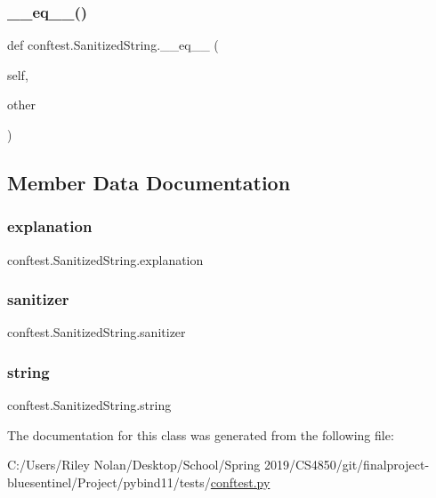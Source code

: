 \subsubsection{\texorpdfstring{\_\_eq\_\_()}{\_\_eq\_\_()}}
{\footnotesize\ttfamily def conftest.\+Sanitized\+String.\+\_\+\+\_\+eq\+\_\+\+\_\+ (\begin{DoxyParamCaption}\item[{}]{self,  }\item[{}]{other }\end{DoxyParamCaption})}



\subsection{Member Data Documentation}
\mbox{\label{classconftest_1_1_sanitized_string_a5088218f27599cac6d008378f8d4215a}} 
\subsubsection{\texorpdfstring{explanation}{explanation}}
{\footnotesize\ttfamily conftest.\+Sanitized\+String.\+explanation}

\mbox{\label{classconftest_1_1_sanitized_string_a255c61966d13208bffeee9547d87b2e3}} 
\subsubsection{\texorpdfstring{sanitizer}{sanitizer}}
{\footnotesize\ttfamily conftest.\+Sanitized\+String.\+sanitizer}

\mbox{\label{classconftest_1_1_sanitized_string_af71c192b9f0d0cb02747c08235931897}} 
\subsubsection{\texorpdfstring{string}{string}}
{\footnotesize\ttfamily conftest.\+Sanitized\+String.\+string}



The documentation for this class was generated from the following file\+:\begin{DoxyCompactItemize}
\item 
C\+:/\+Users/\+Riley Nolan/\+Desktop/\+School/\+Spring 2019/\+C\+S4850/git/finalproject-\/bluesentinel/\+Project/pybind11/tests/\mbox{\hyperlink{conftest_8py}{conftest.\+py}}\end{DoxyCompactItemize}
